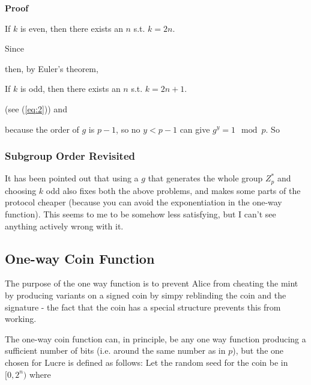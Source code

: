 \documentclass[a4paper,titlepage]{article}
\begin{document}

{\bf Proof}

If $k$ is even, then there exists an $n$
s.t. $k=2n$.


Since


then, by Euler's theorem, 


If $k$ is odd, then there exists an $n$ s.t. $k=2n+1$.



(see (\ref{eq:2})) and


because the order of $g$ is $p-1$, so no $y < p-1$ can give $g^y=1
 \mod p$. So


\subsubsection{Subgroup Order Revisited}

It has been pointed out that using a $g$ that generates the whole
group $Z_p^*$ and choosing $k$ odd also fixes both the above problems,
and makes some parts of the protocol cheaper (because you can avoid
the exponentiation in the one-way function). This seems to me to be
somehow less satisfying, but I can't see anything actively wrong with
it.

\subsection{One-way Coin Function}
\label{sec:oneway}

The purpose of the one way function is to prevent Alice from cheating
the mint by producing variants on a signed coin by simpy reblinding
the coin and the signature - the fact that the coin has a special
structure prevents this from working.

The one-way coin function can, in principle, be any one way function
producing a sufficient number of bits (i.e. around the same number as
in $p$), but the one chosen for Lucre is defined as follows: Let the
random seed for the coin be in $[0,2^n)$ where
\end{document}
